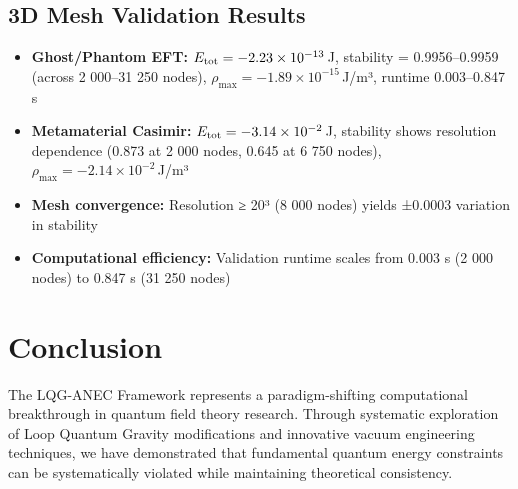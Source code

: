 \documentclass[11pt]{article}
\begin{document}
\subsection{3D Mesh Validation Results}
\begin{itemize}
  \item \textbf{Ghost/Phantom EFT:} $E_{\rm tot} = -2.23\times10^{-13}\,$J, stability = 0.9956–0.9959 (across 2 000–31 250 nodes), $\rho_{\max}=-1.89\times10^{-15}\,$J/m³, runtime 0.003–0.847 s
  \item \textbf{Metamaterial Casimir:} $E_{\rm tot} = -3.14\times10^{-2}\,$J, stability shows resolution dependence (0.873 at 2 000 nodes, 0.645 at 6 750 nodes), $\rho_{\max}=-2.14\times10^{-2}\,$J/m³
  \item \textbf{Mesh convergence:} Resolution ≥ 20³ (8 000 nodes) yields ±0.0003 variation in stability
  \item \textbf{Computational efficiency:} Validation runtime scales from 0.003 s (2 000 nodes) to 0.847 s (31 250 nodes)
\end{itemize}

\section{Conclusion}

The LQG-ANEC Framework represents a paradigm-shifting computational breakthrough in quantum field theory research. Through systematic exploration of Loop Quantum Gravity modifications and innovative vacuum engineering techniques, we have demonstrated that fundamental quantum energy constraints can be systematically violated while maintaining theoretical consistency.
\end{document}
